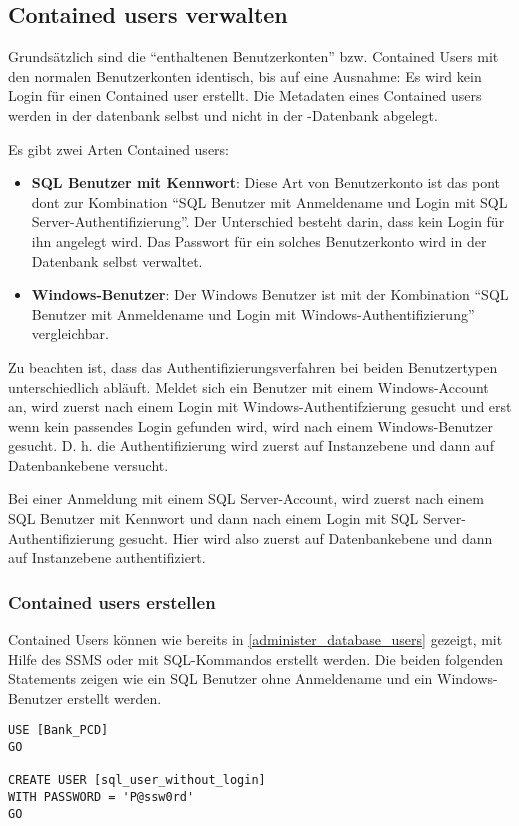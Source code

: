         \subsection{Contained users verwalten}
          Grundsätzlich sind die \enquote{enthaltenen Benutzerkonten} bzw.
          Contained Users mit den normalen Benutzerkonten identisch, bis auf
          eine Ausnahme: Es wird kein Login für einen Contained user erstellt.
          Die Metadaten eines Contained users werden in der datenbank selbst und
          nicht in der -Datenbank abgelegt.
          
          Es gibt zwei Arten Contained users:
          \begin{itemize}
            \item \textbf{SQL Benutzer mit Kennwort}: Diese Art von
            Benutzerkonto ist das pont dont zur Kombination \enquote{SQL
            Benutzer mit Anmeldename und Login mit SQL
            Server-Authentifizierung}. Der Unterschied besteht darin, dass kein
            Login für ihn angelegt wird. Das Passwort für ein solches
            Benutzerkonto wird in der Datenbank selbst verwaltet.
            \item \textbf{Windows-Benutzer}: Der Windows Benutzer ist mit
            der Kombination \enquote{SQL Benutzer mit Anmeldename und Login mit
            Windows-Authentifizierung} vergleichbar.
          \end{itemize}          
          Zu beachten ist, dass das Authentifizierungsverfahren bei beiden
          Benutzertypen unterschiedlich abläuft. Meldet sich ein Benutzer mit
          einem Windows-Account an, wird zuerst nach einem Login mit
          Windows-Authentifzierung gesucht und erst wenn kein passendes Login
          gefunden wird, wird nach einem Windows-Benutzer gesucht. D. h. die
          Authentifizierung wird zuerst auf Instanzebene und dann auf
          Datenbankebene versucht.
          
          Bei einer Anmeldung mit einem SQL Server-Account, wird zuerst nach
          einem SQL Benutzer mit Kennwort und dann nach einem Login mit SQL
          Server-Authentifizierung gesucht. Hier wird also zuerst auf
          Datenbankebene und dann auf Instanzebene authentifiziert.
          \subsubsection{Contained users erstellen}
            Contained Users können wie bereits in
            \ref{administer_database_users} gezeigt, mit Hilfe des SSMS oder mit
            SQL-Kommandos erstellt werden. Die beiden folgenden Statements
            zeigen wie ein SQL Benutzer ohne Anmeldename und ein
            Windows-Benutzer erstellt werden.
            \begin{lstlisting}[language=ms_sql,caption={Erstellen
            eines SQL Benutzers mit Kennwort},label=sql20_04]
USE [Bank_PCD]
GO

CREATE USER [sql_user_without_login]
WITH PASSWORD = 'P@ssw0rd'
GO
            \end{lstlisting}
            
